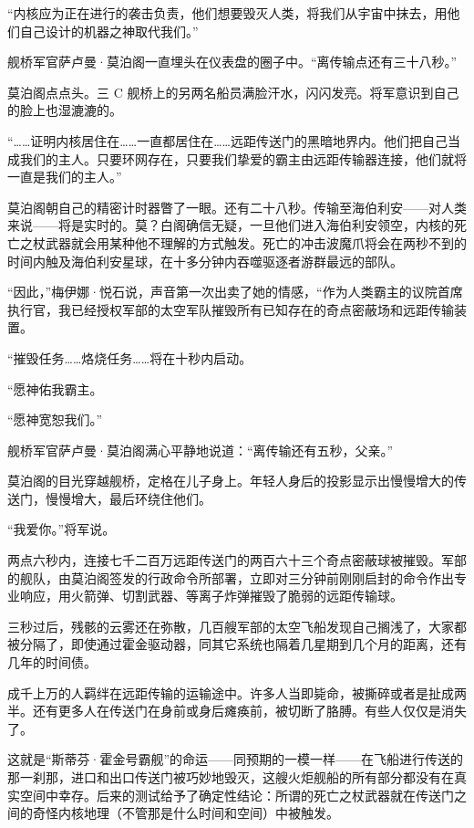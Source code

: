 \documentclass[AutoFakeBold=true]{book}
\begin{document}
``内核应为正在进行的袭击负责，他们想要毁灭人类，将我们从宇宙中抹去，用他们自己设计的机器之神取代我们。''

舰桥军官萨卢曼·莫泊阁一直埋头在仪表盘的圈子中。``离传输点还有三十八秒。''

莫泊阁点点头。三 C 舰桥上的另两名船员满脸汗水，闪闪发亮。将军意识到自己的脸上也湿漉漉的。

``……证明内核居住在……一直都居住在……远距传送门的黑暗地界内。他们把自己当成我们的主人。只要环网存在，只要我们挚爱的霸主由远距传输器连接，他们就将一直是我们的主人。''

莫泊阁朝自己的精密计时器瞥了一眼。还有二十八秒。传输至海伯利安——对人类来说——将是实时的。莫？白阁确信无疑，一旦他们进入海伯利安领空，内核的死亡之杖武器就会用某种他不理解的方式触发。死亡的冲击波魔爪将会在两秒不到的时间内触及海伯利安星球，在十多分钟内吞噬驱逐者游群最远的部队。

``因此，''梅伊娜·悦石说，声音第一次出卖了她的情感，``作为人类霸主的议院首席执行官，我已经授权军部的太空军队摧毁所有已知存在的奇点密蔽场和远距传输装置。

``摧毁任务……烙烧任务……将在十秒内启动。

``愿神佑我霸主。

``愿神宽恕我们。''

舰桥军官萨卢曼·莫泊阁满心平静地说道：``离传输还有五秒，父亲。''

莫泊阁的目光穿越舰桥，定格在儿子身上。年轻人身后的投影显示出慢慢增大的传送门，慢慢增大，最后环绕住他们。

``我爱你。''将军说。

\vspace*{1em}

两点六秒内，连接七千二百万远距传送门的两百六十三个奇点密蔽球被摧毁。军部的舰队，由莫泊阁签发的行政命令所部署，立即对三分钟前刚刚启封的命令作出专业响应，用火箭弹、切割武器、等离子炸弹摧毁了脆弱的远距传输球。

三秒过后，残骸的云雾还在弥散，几百艘军部的太空飞船发现自己搁浅了，大家都被分隔了，即使通过霍金驱动器，同其它系统也隔着几星期到几个月的距离，还有几年的时间债。

成千上万的人羁绊在远距传输的运输途中。许多人当即毙命，被撕碎或者是扯成两半。还有更多人在传送门在身前或身后瘫痪前，被切断了胳膊。有些人仅仅是消失了。

这就是``斯蒂芬·霍金号霸舰''的命运——同预期的一模一样——在飞船进行传送的那一刹那，进口和出口传送门被巧妙地毁灭，这艘火炬舰船的所有部分都没有在真实空间中幸存。后来的测试给予了确定性结论：所谓的死亡之杖武器就在传送门之间的奇怪内核地理（不管那是什么时间和空间）中被触发。
\end{document}
